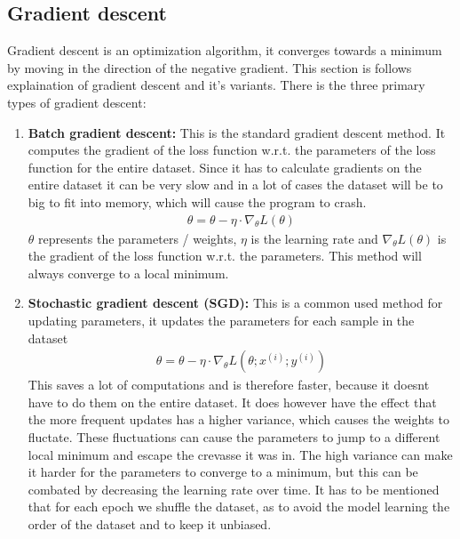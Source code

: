 \documentclass[a4paper,12pt]{article}
\begin{document}
\subsection{Gradient descent}
Gradient descent is an optimization algorithm, it converges towards a minimum by moving in the direction of the negative gradient. This section is follows \cite{ruder2016overview} explaination of gradient descent and it's variants.
There is the three primary types of gradient descent:
\begin{enumerate}
  \item \textbf{Batch gradient descent:}
  This is the standard gradient descent method. It computes the gradient of the loss function w.r.t. the parameters of the loss function for the entire dataset.
  Since it has to calculate gradients on the entire dataset it can be very slow and in a lot of cases the dataset will be to big to fit into memory, which will cause the program to crash.
  \begin{align}
  \theta = \theta - \eta \cdot \nabla_\theta L(\theta)
  \end{align}
$\theta$ represents the parameters / weights, $\eta$ is the learning rate and $\nabla_\theta L(\theta)$ is the gradient of the loss function w.r.t. the parameters.
This method will always converge to a local minimum. 

  \item \textbf{Stochastic gradient descent (SGD):}
This is a common used method for updating parameters, it updates the parameters for each sample in the dataset
\begin{align}
\theta = \theta - \eta \cdot \nabla_\theta L(\theta; x^{(i)}; y^{(i)})
\end{align}
This saves a lot of computations and is therefore faster, because it doesnt have to do them on the entire dataset. It does however have the effect that the more frequent updates has a higher variance, which causes the weights to fluctate.
These fluctuations can cause the parameters to jump to a different local minimum and escape the crevasse it was in. The high variance can make it harder for the parameters to converge to a minimum, but this can be combated by decreasing the learning rate over time. It has to be mentioned that for each epoch we shuffle the dataset, as to avoid the model learning the order of the dataset and to keep it unbiased.


\end{enumerate}
\end{document}
